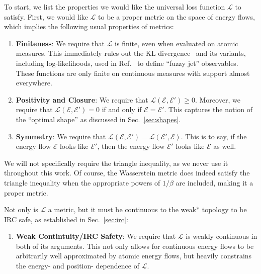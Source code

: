\documentclass[letterpaper,11pt]{article}
\newcommand{\E}{\mathcal{E}}
\DeclareRobustCommand{\Sec}[1]{Sec.~\ref{sec:#1}}
\DeclareRobustCommand{\Refer}[1]{Ref.~\cite{#1}}
\begin{document}
To start, we list the properties we would like the universal loss function $\mathcal{L}$ to satisfy. First, we would like $\mathcal{L}$ to be a proper metric on the space of energy flows, which implies the following usual properties of metrics:
%
\begin{enumerate}
    \item \textbf{Finiteness}: We require that $\mathcal{L}$ is finite, even when evaluated on atomic measures. This immediately rules out the KL divergence~\cite{kullback1951information} and its variants, including log-likelihoods, used in \Refer{Mackey:2015hwa} to define ``fuzzy jet'' observables. These functions are only finite on continuous measures with support almost everywhere. 
    \item \textbf{Positivity and Closure}: We require that $\mathcal{L}(\E, \E') \geq 0$. Moreover, we require that  $\mathcal{L}(\E, \E') = 0$ if and only if $\E = \E'$. This captures the notion of the ``optimal shape'' as discussed in \Sec{shapes}.
    \item \textbf{Symmetry}: We require that $\mathcal{L}(\E, \E') = \mathcal{L}(\E', \E)$. This is to say, if the energy flow $\E$ looks like $\E'$, then the energy flow $\E'$ looks like $\E$ as well. 
    \setcounter{enumTemp}{\theenumi}
\end{enumerate}
%
We will not specifically require the triangle inequality, as we never use it throughout this work. Of course, the Wasserstein metric does indeed satisfy the triangle inequality when the appropriate powers of $1/\beta$ are included, making it a proper metric.

Not only is $\mathcal{L}$ a metric, but it must be continuous to the weak* topology to be IRC safe, as established in \Sec{irc}:
%
\begin{enumerate}
    \setcounter{enumi}{\theenumTemp}
    \item \textbf{Weak Contintuity/IRC Safety}: We require that $\mathcal{L}$ is weakly continuous in both of its arguments. This not only allows for continuous energy flows to be arbitrarily well approximated by atomic energy flows, but heavily constrains the energy- and position- dependence of $\mathcal{L}$.
    \setcounter{enumTemp}{\theenumi}
\end{enumerate}
%
\end{document}
